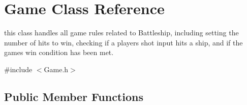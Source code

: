 \hypertarget{classGame}{}\section{Game Class Reference}
\label{classGame}


this class handles all game rules related to Battleship, including setting the number of hits to win, checking if a player\textquotesingle{}s shot input hits a ship, and if the game\textquotesingle{}s win condition has been met.  




{\ttfamily \#include $<$Game.\+h$>$}

\subsection*{Public Member Functions}
